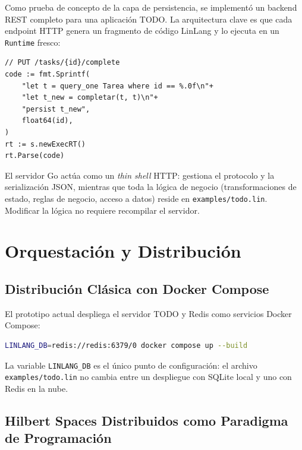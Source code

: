 \documentclass[12pt, a4paper, openany]{report}
\theoremstyle{definition}
\begin{document}
Como prueba de concepto de la capa de persistencia, se implementó un backend REST completo para una aplicación TODO. La arquitectura clave es que cada endpoint HTTP genera un fragmento de código LinLang y lo ejecuta en un \texttt{Runtime} fresco:

\begin{lstlisting}[style=go, caption={Handler HTTP completamente dirigido por LinLang}]
// PUT /tasks/{id}/complete
code := fmt.Sprintf(
    "let t = query_one Tarea where id == %.0f\n"+
    "let t_new = completar(t, t)\n"+
    "persist t_new",
    float64(id),
)
rt := s.newExecRT()
rt.Parse(code)
\end{lstlisting}

El servidor Go actúa como un \emph{thin shell} HTTP: gestiona el protocolo y la serialización JSON, mientras que toda la lógica de negocio (transformaciones de estado, reglas de negocio, acceso a datos) reside en \texttt{examples/todo.lin}. Modificar la lógica no requiere recompilar el servidor.

\chapter{Orquestación y Distribución}
\label{ch:distribucion}

\section{Distribución Clásica con Docker Compose}

El prototipo actual despliega el servidor TODO y Redis como servicios Docker Compose:

\begin{lstlisting}[language=bash, caption={Despliegue completo con un comando}]
LINLANG_DB=redis://redis:6379/0 docker compose up --build
\end{lstlisting}

La variable \texttt{LINLANG\_DB} es el único punto de configuración: el archivo \texttt{examples/todo.lin} no cambia entre un despliegue con SQLite local y uno con Redis en la nube.

\section{Hilbert Spaces Distribuidos como Paradigma de Programación}
\label{sec:hilbert-distribuido}
\end{document}
